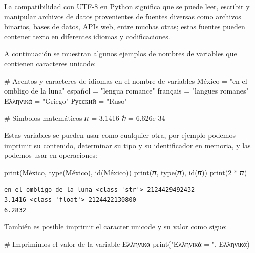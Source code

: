 \documentclass[
  spanish,
  letterpaper,
]{scrbook}
\newenvironment{Shaded}{\begin{snugshade}}{\end{snugshade}}
\newcommand{\BuiltInTok}[1]{\textcolor[rgb]{0.00,0.23,0.31}{#1}}
\newcommand{\CommentTok}[1]{\textcolor[rgb]{0.37,0.37,0.37}{#1}}
\newcommand{\DecValTok}[1]{\textcolor[rgb]{0.68,0.00,0.00}{#1}}
\newcommand{\FloatTok}[1]{\textcolor[rgb]{0.68,0.00,0.00}{#1}}
\newcommand{\NormalTok}[1]{\textcolor[rgb]{0.00,0.23,0.31}{#1}}
\newcommand{\OperatorTok}[1]{\textcolor[rgb]{0.37,0.37,0.37}{#1}}
\newcommand{\StringTok}[1]{\textcolor[rgb]{0.13,0.47,0.30}{#1}}
\theoremstyle{definition}
\theoremstyle{remark}
\begin{document}
La compatibilidad con UTF-8 en Python significa que se puede leer,
escribir y manipular archivos de datos provenientes de fuentes diversas
como archivos binarios, bases de datos, APIs web, entre muchas otras;
estas fuentes pueden contener texto en diferentes idiomas y
codificaciones.

A continuación se muestran algunos ejemplos de nombres de variables que
contienen caracteres unicode:

\begin{Shaded}
\begin{Highlighting}[]
\CommentTok{\# Acentos y caracteres de idiomas en el nombre de variables}
\NormalTok{México }\OperatorTok{=} \StringTok{"en el ombligo de la luna"}
\NormalTok{español }\OperatorTok{=} \StringTok{"lengua romance"}
\NormalTok{français }\OperatorTok{=} \StringTok{"langues romanes"}
\NormalTok{Ελληνικά }\OperatorTok{=} \StringTok{"Griego"}
\NormalTok{Русский }\OperatorTok{=} \StringTok{"Ruso"}

\CommentTok{\# Símbolos matemáticos}
\NormalTok{𝜋 }\OperatorTok{=} \FloatTok{3.1416}
\NormalTok{ℏ }\OperatorTok{=} \FloatTok{6.626e{-}34}
\end{Highlighting}
\end{Shaded}

Estas variables se pueden usar como cualquier otra, por ejemplo podemos
imprimir su contenido, determinar su tipo y su identificador en memoria,
y las podemos usar en operaciones:

\begin{Shaded}
\begin{Highlighting}[]
\BuiltInTok{print}\NormalTok{(México, }\BuiltInTok{type}\NormalTok{(México), }\BuiltInTok{id}\NormalTok{(México))}
\BuiltInTok{print}\NormalTok{(𝜋, }\BuiltInTok{type}\NormalTok{(𝜋), }\BuiltInTok{id}\NormalTok{(𝜋))}
\BuiltInTok{print}\NormalTok{(}\DecValTok{2} \OperatorTok{*}\NormalTok{ 𝜋)}
\end{Highlighting}
\end{Shaded}

\begin{verbatim}
en el ombligo de la luna <class 'str'> 2124429492432
3.1416 <class 'float'> 2124422130800
6.2832
\end{verbatim}

También es posible imprimir el caracter unicode y su valor como sigue:

\begin{Shaded}
\begin{Highlighting}[]
\CommentTok{\# Imprimimos el valor de la variable Ελληνικά}
\BuiltInTok{print}\NormalTok{(}\StringTok{"Ελληνικά = "}\NormalTok{, Ελληνικά)}
\end{Highlighting}
\end{Shaded}
\end{document}
